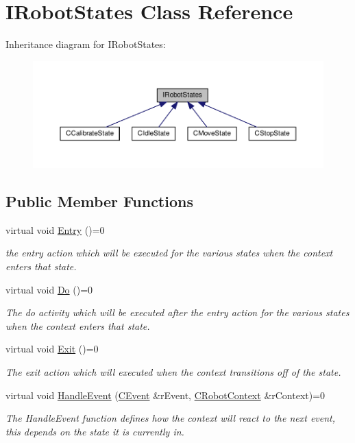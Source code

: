 \hypertarget{classIRobotStates}{}\section{I\+Robot\+States Class Reference}
\label{classIRobotStates}


Inheritance diagram for I\+Robot\+States\+:\nopagebreak
\begin{figure}[H]
\begin{center}
\leavevmode
\includegraphics[width=350pt]{classIRobotStates__inherit__graph}
\end{center}
\end{figure}
\subsection*{Public Member Functions}
\begin{DoxyCompactItemize}
\item 
virtual void \hyperlink{classIRobotStates_af43ddb52f5100b42c3d11b71fb1f10dd}{Entry} ()=0
\begin{DoxyCompactList}\small\item\em the entry action which will be executed for the various states when the context enters that state. \end{DoxyCompactList}\item 
virtual void \hyperlink{classIRobotStates_aa681381e72738a2870c3f13f552a2e93}{Do} ()=0
\begin{DoxyCompactList}\small\item\em The do activity which will be executed after the entry action for the various states when the context enters that state. \end{DoxyCompactList}\item 
virtual void \hyperlink{classIRobotStates_a099417875e67f047ca38e08890491529}{Exit} ()=0
\begin{DoxyCompactList}\small\item\em The exit action which will executed when the context transitions off of the state. \end{DoxyCompactList}\item 
virtual void \hyperlink{classIRobotStates_a0b6c28a3deed04f93371a9395022f1ed}{Handle\+Event} (\hyperlink{classCEvent}{C\+Event} \&r\+Event, \hyperlink{classCRobotContext}{C\+Robot\+Context} \&r\+Context)=0
\begin{DoxyCompactList}\small\item\em The Handle\+Event function defines how the context will react to the next event, this depends on the state it is currently in. \end{DoxyCompactList}\end{DoxyCompactItemize}


